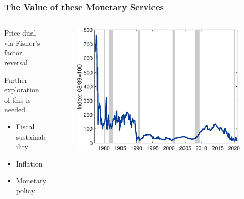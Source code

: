 \documentclass[11pt, handout, aspectratio=169]{beamer}
\newenvironment{wideitemize}{\itemize\addtolength{\itemsep}{10pt}}{\enditemize}
\begin{document}
\begin{frame}
\frametitle{The Value of these Monetary Services}
\begin{columns}
	\begin{column}{.45\textwidth}
		\begin{wideitemize}
			\item Price dual via Fisher's factor reversal
			\item Further exploration of this is needed
			\begin{itemize}
				\item Fiscal sustainability
				\item Inflation
				\item Monetary policy
			\end{itemize}
		\end{wideitemize}
	\end{column}
	\begin{column}{.55\textwidth}
		\begin{figure}[p]
			\centering
			\includegraphics[width=\textwidth]{../Figures/FiscalCapacity_Index.eps}
		\end{figure}
	\end{column}
\end{columns}
\end{frame}

\appendix
\end{document}
